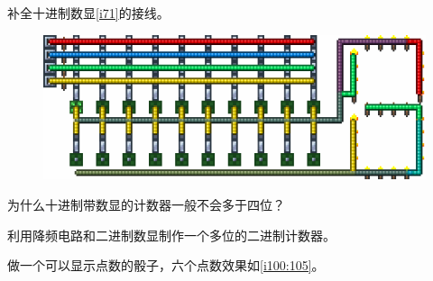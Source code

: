 \begin{problemset}
\begin{figure}[h]
\begin{center}
{}
\end{center}
\caption{}
\label{i69:70}
\end{figure}
\item 补全十进制数显\autoref{i71}的接线。
\begin{figure}[h]
\centering
\includegraphics{images/71.png}
\caption{}
\label{i71}
\end{figure}
\item 为什么十进制带数显的计数器一般不会多于四位？
\item 利用降频电路和二进制数显制作一个多位的二进制计数器。
\item 做一个可以显示点数的骰子，六个点数效果如\autoref{i100:105}。
\begin{figure}[h]
\begin{center}
\end{center}
\end{figure}
\end{problemset}
